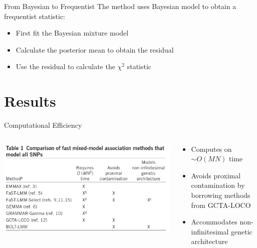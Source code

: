 \documentclass[aspectratio=169]{beamer}\usepackage[]{graphicx}\usepackage[]{color}
\begin{document}
\begin{frame}{From Bayesian to Frequentist}
The method uses Bayesian model to obtain a frequentist statistic:
\begin{itemize}
\item First fit the Bayesian mixture model
\item Calculate the posterior mean to obtain the residual
\item Use the residual to calculate the $\chi^2$ statistic
\end{itemize}
\end{frame}

\section{Results}

\begin{frame}{Computational Efficiency}
\begin{columns}[onlytextwidth]
\begin{column}{0.6\textwidth}
\includegraphics[scale=.25]{./figure/Table1.png}
\end{column}
\begin{column}{0.4\textwidth}
\begin{itemize}
\item Computes on $\sim O(MN)$ time
\item Avoids proximal contamination by borrowing methods from GCTA-LOCO
\item Accommodates non-infinitesimal genetic architecture
\end{itemize}
\end{column}
\end{columns}
\end{frame}
\end{document}
